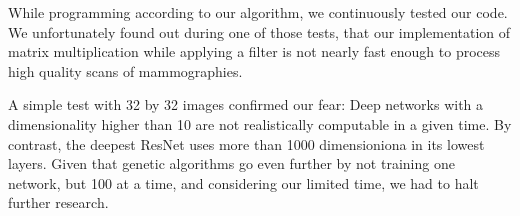 While programming according to our algorithm, we continuously tested our code.\\
We unfortunately found out during one of those tests, that our implementation of matrix multiplication while applying a filter is not nearly fast enough to process high quality scans of mammographies.

A simple test with 32 by 32 images confirmed our fear: Deep networks with a dimensionality higher than 10 are not realistically computable in a given time. By contrast, the deepest ResNet uses more than 1000 dimensioniona in its lowest layers. Given that genetic algorithms go even further by not training one network, but 100 at a time, and considering our limited time, we had to halt further research.

